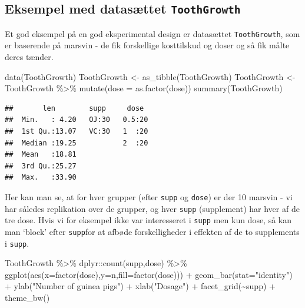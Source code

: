 \documentclass[
]{book}
\newenvironment{Shaded}{\begin{snugshade}}{\end{snugshade}}
\newcommand{\AttributeTok}[1]{\textcolor[rgb]{0.77,0.63,0.00}{#1}}
\newcommand{\FunctionTok}[1]{\textcolor[rgb]{0.00,0.00,0.00}{#1}}
\newcommand{\NormalTok}[1]{#1}
\newcommand{\OtherTok}[1]{\textcolor[rgb]{0.56,0.35,0.01}{#1}}
\newcommand{\SpecialCharTok}[1]{\textcolor[rgb]{0.00,0.00,0.00}{#1}}
\newcommand{\StringTok}[1]{\textcolor[rgb]{0.31,0.60,0.02}{#1}}
\begin{document}
\hypertarget{eksempel-med-datasuxe6ttet-toothgrowth}{%
\subsection{\texorpdfstring{Eksempel med datasættet \texttt{ToothGrowth}}{Eksempel med datasættet ToothGrowth}}\label{eksempel-med-datasuxe6ttet-toothgrowth}}

Et god eksempel på en god eksperimental design er datasættet \texttt{ToothGrowth}, som er baserende på marsvin - de fik forskellige kosttilskud og doser og så fik målte deres tænder.

\begin{Shaded}
\begin{Highlighting}[]
\FunctionTok{data}\NormalTok{(ToothGrowth)}
\NormalTok{ToothGrowth }\OtherTok{\textless{}{-}} \FunctionTok{as\_tibble}\NormalTok{(ToothGrowth)}
\NormalTok{ToothGrowth }\OtherTok{\textless{}{-}}\NormalTok{ ToothGrowth }\SpecialCharTok{\%\textgreater{}\%} \FunctionTok{mutate}\NormalTok{(}\AttributeTok{dose =} \FunctionTok{as.factor}\NormalTok{(dose))}
\FunctionTok{summary}\NormalTok{(ToothGrowth)}
\end{Highlighting}
\end{Shaded}

\begin{verbatim}
##       len        supp     dose   
##  Min.   : 4.20   OJ:30   0.5:20  
##  1st Qu.:13.07   VC:30   1  :20  
##  Median :19.25           2  :20  
##  Mean   :18.81                   
##  3rd Qu.:25.27                   
##  Max.   :33.90
\end{verbatim}

Her kan man se, at for hver grupper (efter \texttt{supp} og \texttt{dose}) er der 10 marsvin - vi har således replikation over de grupper, og hver \texttt{supp} (supplement) har hver af de tre dose. Hvis vi for eksempel ikke var interesseret i \texttt{supp} men kun dose, så kan man `block' efter \texttt{supp}for at afbøde forskelligheder i effekten af de to supplements i \texttt{supp}.

\begin{Shaded}
\begin{Highlighting}[]
\NormalTok{ToothGrowth }\SpecialCharTok{\%\textgreater{}\%}\NormalTok{ dplyr}\SpecialCharTok{::}\FunctionTok{count}\NormalTok{(supp,dose) }\SpecialCharTok{\%\textgreater{}\%} 
  \FunctionTok{ggplot}\NormalTok{(}\FunctionTok{aes}\NormalTok{(}\AttributeTok{x=}\FunctionTok{factor}\NormalTok{(dose),}\AttributeTok{y=}\NormalTok{n,}\AttributeTok{fill=}\FunctionTok{factor}\NormalTok{(dose))) }\SpecialCharTok{+} 
    \FunctionTok{geom\_bar}\NormalTok{(}\AttributeTok{stat=}\StringTok{"identity"}\NormalTok{) }\SpecialCharTok{+} 
    \FunctionTok{ylab}\NormalTok{(}\StringTok{"Number of guinea pigs"}\NormalTok{) }\SpecialCharTok{+} 
    \FunctionTok{xlab}\NormalTok{(}\StringTok{"Dosage"}\NormalTok{) }\SpecialCharTok{+}
    \FunctionTok{facet\_grid}\NormalTok{(}\SpecialCharTok{\textasciitilde{}}\NormalTok{supp) }\SpecialCharTok{+}
    \FunctionTok{theme\_bw}\NormalTok{()}
\end{Highlighting}
\end{Shaded}
\end{document}
